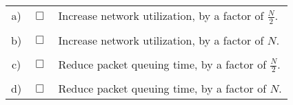 \documentclass{llncs}
\newcommand{\answer}[1]{}%
\begin{document}
\begin{tabular}{ccl}
  a) & $\Box$ & Increase network utilization, by a factor of $\frac{N}{2}$.\\
  \\
  b) & $\Box$ &  Increase network utilization, by a factor of $N$.\\
  \\
  c) & $\Box$ &  Reduce packet queuing time, by a factor of $\frac{N}{2}$.\\
  \\
  d) & $\Box$ &  Reduce packet queuing time, by a factor of $N$.\\
\end{tabular}

\answer{Pipelining increases network utilization by a factor of $N$,
  see slide 45. It won't reduce packet queuing time -- it might even
  increase it when there is congestion.}
\end{document}
